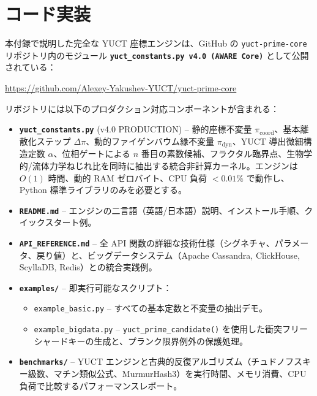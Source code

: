 \documentclass[12pt,a4paper]{article}
\begin{document}
	\section{コード実装}
	\label{sec:code}
	
	本付録で説明した完全な \textsc{YUCT} 座標エンジンは、GitHub の \texttt{yuct-prime-core} リポジトリ内のモジュール
	\textbf{\texttt{yuct\_constants.py v4.0 (AWARE Core)}} として公開されている：
	\begin{center}
		\url{https://github.com/Alexey-Yakushev-YUCT/yuct-prime-core}
	\end{center}
	
	\noindent リポジトリには以下のプロダクション対応コンポーネントが含まれる：
	
	\begin{itemize}
		\item \textbf{\texttt{yuct\_constants.py}} (v4.0 PRODUCTION) – 静的座標不変量 $\pi_{\mathrm{coord}}$、基本離散化ステップ $\Delta\pi$、動的ファイゲンバウム縁不変量 $\pi_{\mathrm{dyn}}$、YUCT 導出微細構造定数 $\alpha$、位相ゲートによる $n$ 番目の素数候補、フラクタル臨界点、生物学的/流体力学ねじれ比を同時に抽出する統合非計算カーネル。エンジンは $O(1)$ 時間、動的 RAM ゼロバイト、CPU 負荷 $<0.01\%$ で動作し、Python 標準ライブラリのみを必要とする。
		
		\item \textbf{\texttt{README.md}} – エンジンの二言語（英語/日本語）説明、インストール手順、クイックスタート例。
		
		\item \textbf{\texttt{API\_REFERENCE.md}} – 全 API 関数の詳細な技術仕様（シグネチャ、パラメータ、戻り値）と、ビッグデータシステム（Apache Cassandra, ClickHouse, ScyllaDB, Redis）との統合実践例。
		
		\item \textbf{\texttt{examples/}} – 即実行可能なスクリプト：
		\begin{itemize}
			\item \texttt{example\_basic.py} – すべての基本定数と不変量の抽出デモ。
			\item \texttt{example\_bigdata.py} – \texttt{yuct\_prime\_candidate()} を使用した衝突フリーシャードキーの生成と、プランク限界例外の保護処理。
		\end{itemize}
		
		\item \textbf{\texttt{benchmarks/}} – YUCT エンジンと古典的反復アルゴリズム（チュドノフスキー級数、マチン類似公式、MurmurHash3）を実行時間、メモリ消費、CPU 負荷で比較するパフォーマンスレポート。
	\end{itemize}
	
\end{document}
